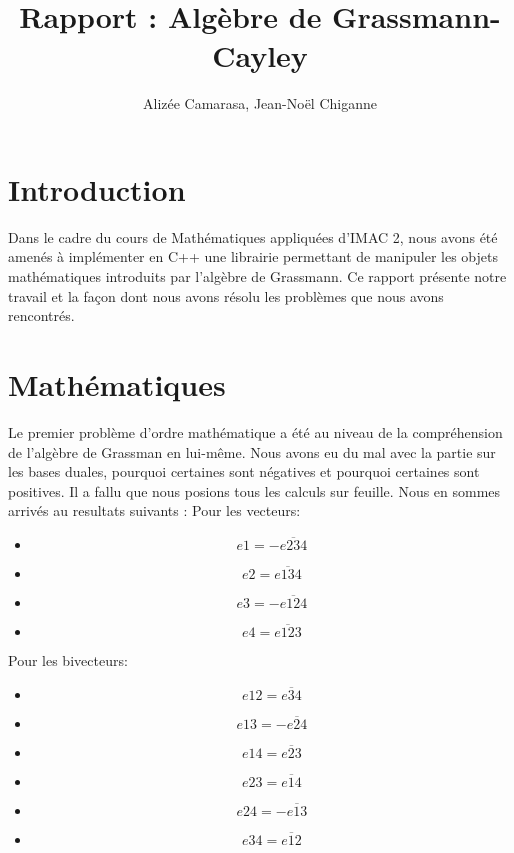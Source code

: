 \documentclass[12pt]{article}
\begin{document}
\pagestyle{headings}

\title{Rapport : Algèbre de Grassmann-Cayley}
\author{Alizée Camarasa, Jean-Noël Chiganne}
\maketitle
\newpage
\tableofcontents

\newpage
\section{Introduction}
Dans le cadre du cours de Mathématiques appliquées d'IMAC 2, nous avons été amenés à implémenter en C++ une librairie permettant de manipuler les objets mathématiques introduits par l'algèbre de Grassmann.
Ce rapport présente notre travail et la façon dont nous avons résolu les problèmes que nous avons rencontrés.


\newpage

\section{Mathématiques}
Le premier problème d’ordre mathématique a été au niveau de la compréhension de l’algèbre de Grassman en lui-même. Nous avons eu du mal avec la partie sur les bases duales, pourquoi certaines sont négatives et pourquoi certaines sont positives. Il a fallu que nous posions tous les calculs sur feuille. Nous en sommes arrivés au resultats suivants : 
\newline Pour les vecteurs: 
\begin{itemize}
\item $$e1=-\overline{e234}$$  \item $$e2=\overline{e134}$$ \item $$e3=-\overline{e124}$$ \item $$e4=\overline{e123}$$ 
\end{itemize}
Pour les bivecteurs:
\begin{itemize}
\item $$e12=\overline{e34}$$ \item $$ e13=-\overline{e24}$$ \item $$e14=\overline{e23}$$ \item $$e23=\overline{e14}$$ \item $$e24=-\overline{e13}$$ \item $$e34=\overline{e12}$$

\end{itemize}
\end{document}
